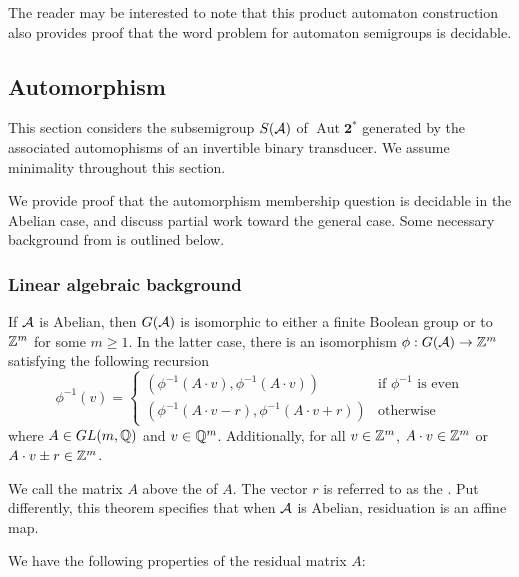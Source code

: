 \documentclass[11pt, titlepage]{article}
\begin{document}
The reader may be interested to note that this product automaton
construction also provides proof that the word problem for automaton
semigroups is decidable.

\subsection{Automorphism }

This section considers the subsemigroup $S(\mathcal{A})$ of
$\operatorname{Aut}\textbf{2}^*$ generated by the associated automophisms of
an invertible binary transducer. We assume minimality throughout this
section.

We provide proof that the automorphism membership question is
decidable in the Abelian case, and discuss partial work toward the
general case. Some necessary background from
\cite{NekrashevychSidki04:automorphisms} is outlined below.

\subsubsection{Linear algebraic background}

\begin{theorem}
  If $\mathcal{A}$ is Abelian, then $G(\mathcal{A})$ is isomorphic to either a finite
  Boolean group or to $\mathbb{Z}^m$ for some $m \geq 1$. In the latter case,
  there is an isomorphism $\phi : G(\mathcal{A}) \rightarrow \mathbb{Z}^m$ satisfying
  the following recursion
\[
  \phi^{-1}(v) =
  \begin{cases}
    (\phi^{-1}(A\cdot v), \phi^{-1}(A \cdot v)) & \text{if $\phi^{-1}$ is even}\\
    (\phi^{-1}(A\cdot v - r), \phi^{-1}(A \cdot v + r)) &
    \text{otherwise}
  \end{cases}
\]
where $A \in GL(m,\mathbb{Q})$ and $v \in \mathbb{Q}^m$. Additionally, for all
$v \in \mathbb{Z}^m$, $A\cdot v \in \mathbb{Z}^m$ or $A\cdot v \pm r \in \mathbb{Z}^m$.
\end{theorem}

We call the matrix $A$ above the  of $A$. The
vector $r$ is referred to as the . Put
differently, this theorem specifies that when $\mathcal{A}$ is Abelian,
residuation is an affine map.

We have the following properties of the residual matrix $A$:
\end{document}
